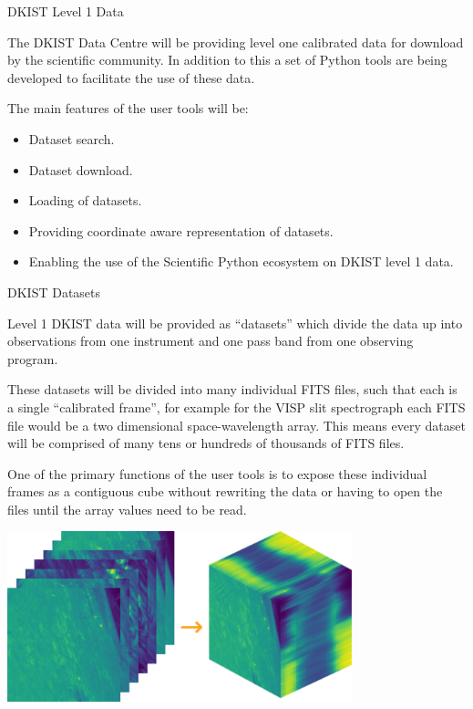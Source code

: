 \documentclass[landscape,a0paper,fontscale=0.32]{baposter}
\begin{document}
\begin{poster}
 
\begin{posterbox}[name=intro,column=0,row=0,span=2]{DKIST Level 1 Data}

  The DKIST Data Centre will be providing level one calibrated data for download
  by the scientific community. In addition to this a set of Python tools are
  being developed to facilitate the use of these data.

  The main features of the user tools will be:
  \begin{itemize}
  \item Dataset search.
  \item Dataset download.
  \item Loading of datasets.
  \item Providing coordinate aware representation of datasets.
  \item Enabling the use of the Scientific Python ecosystem on DKIST level 1
    data.
  \end{itemize}

  
\end{posterbox}

\begin{posterbox}[name=dataset,column=0,row=0,span=1,below=intro]{DKIST Datasets}

  Level 1 DKIST data will be provided as ``datasets'' which divide the data up
  into observations from one instrument and one pass band from one observing
  program.

  These datasets will be divided into many individual FITS files, such that each
  is a single ``calibrated frame'', for example for the VISP slit spectrograph
  each FITS file would be a two dimensional space-wavelength array. This means
  every dataset will be comprised of many tens or hundreds of thousands of FITS
  files.

  One of the primary functions of the user tools is to expose these individual
  frames as a contiguous cube without rewriting the data or having to open the
  files until the array values need to be read.
  
  \begin{center}
    \includegraphics[width=0.75\textwidth]{sequence_and_cube.png}\\[0.4em]
  \end{center}


\end{posterbox}
\end{poster}
\end{document}
